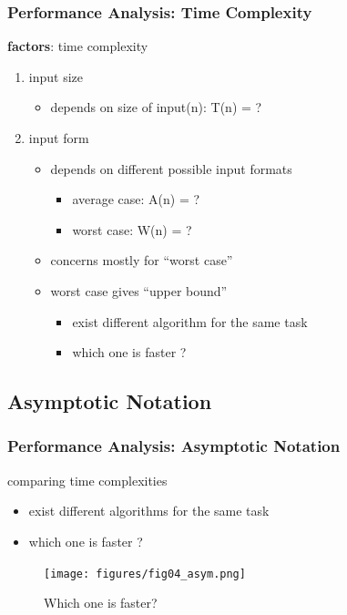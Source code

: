 \documentclass[newPxFont,sthlmFooter,nooffset]{beamer}
\begin{document}
\begin{frame}[t]
  \frametitle{Performance Analysis: Time Complexity}
\textbf{factors}: time complexity 
\begin{enumerate}
\item input size
  \begin{itemize}
  \item depends on size of input(n): T(n) = ?
  \end{itemize}

\item input form
  \begin{itemize}
  \item depends on different possible input formats
    \begin{itemize}
    \item average case: A(n) = ?
    \item worst case: W(n) = ?
    \end{itemize}

  \item concerns mostly for ``worst case''
  \item worst case gives ``upper bound''
    \begin{itemize}
    \item exist different algorithm for the same task
    \item which one is faster ?
    \end{itemize}

  \end{itemize}

\end{enumerate}

\end{frame}


\subsection{Asymptotic Notation}
\begin{frame}[t]
  \frametitle{Performance Analysis: Asymptotic Notation}
comparing time complexities
\begin{itemize}
\item exist different algorithms for the same task
\item which one is faster ?
\end{itemize}
  \begin{figure}[h]
    \centering
    \texttt{[image: figures/fig04\_asym.png]}
    \caption{Which one is faster?}
  \end{figure}
\end{frame}
\end{document}
